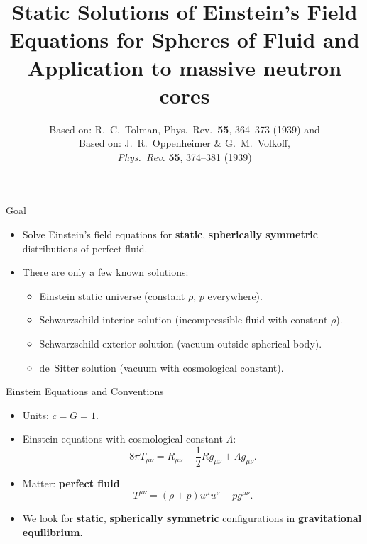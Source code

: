 \documentclass[11pt]{beamer}
\title[Static Fluid Spheres in GR]{Static Solutions of Einstein's Field Equations for Spheres of Fluid and Application to massive neutron cores}
\author[R.~C.~Tolman]{Based on: R.~C.~Tolman, Phys.\ Rev.\ \textbf{55}, 364--373 (1939) and \\
Based on: J.~R.~Oppenheimer \& G.~M.~Volkoff,\\
\emph{Phys.\ Rev.} \textbf{55}, 374--381 (1939)}
\institute{Summary prepared by Gytis Vėjelis}
\date{}
\begin{document}
\begin{frame}
  \titlepage
\end{frame}

\begin{frame}{Goal}
  \begin{itemize}
    \item Solve Einstein's field equations for \textbf{static}, \textbf{spherically symmetric} distributions of perfect fluid.
    \item There are only a few known solutions:
      \begin{itemize}
        \item Einstein static universe (constant $\rho$, $p$ everywhere).
        \item Schwarzschild interior solution (incompressible fluid with constant $\rho$).
        \item Schwarzschild exterior solution (vacuum outside spherical body).
        \item de~Sitter solution (vacuum with cosmological constant).
      \end{itemize}
  \end{itemize}
\end{frame}  %

\begin{frame}{Einstein Equations and Conventions}
  \begin{itemize}
    \item Units: $c=G=1$.
    \item Einstein equations with cosmological constant $\Lambda$:
      \[
        8\pi T_{\mu\nu} = R_{\mu\nu} - \frac{1}{2} R g_{\mu\nu} + \Lambda g_{\mu\nu} .
      \]
    \item Matter: \textbf{perfect fluid}
      \[
        T^{\mu\nu} = (\rho + p) u^\mu u^\nu - p g^{\mu\nu}.
      \]
    \item We look for \textbf{static}, \textbf{spherically symmetric} configurations in \textbf{gravitational equilibrium}.
  \end{itemize}
\end{frame}
\end{document}

